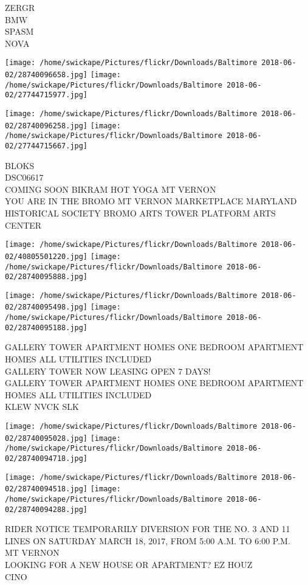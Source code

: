 \documentclass[10pt,letterpaper]{article}
\begin{document}
ZERGR\\
BMW\\
SPASM\\
NOVA
\pagebreak

\texttt{[image: /home/swickape/Pictures/flickr/Downloads/Baltimore 2018-06-02/28740096658.jpg]}
\texttt{[image: /home/swickape/Pictures/flickr/Downloads/Baltimore 2018-06-02/27744715977.jpg]}

\texttt{[image: /home/swickape/Pictures/flickr/Downloads/Baltimore 2018-06-02/28740096258.jpg]}
\texttt{[image: /home/swickape/Pictures/flickr/Downloads/Baltimore 2018-06-02/27744715667.jpg]}

BLOKS\\
DSC06617\\
COMING SOON BIKRAM HOT YOGA MT VERNON\\
YOU ARE IN THE BROMO MT VERNON MARKETPLACE MARYLAND HISTORICAL SOCIETY BROMO ARTS TOWER PLATFORM ARTS CENTER
\pagebreak

\texttt{[image: /home/swickape/Pictures/flickr/Downloads/Baltimore 2018-06-02/40805501220.jpg]}
\texttt{[image: /home/swickape/Pictures/flickr/Downloads/Baltimore 2018-06-02/28740095888.jpg]}

\texttt{[image: /home/swickape/Pictures/flickr/Downloads/Baltimore 2018-06-02/28740095498.jpg]}
\texttt{[image: /home/swickape/Pictures/flickr/Downloads/Baltimore 2018-06-02/28740095188.jpg]}

GALLERY TOWER APARTMENT HOMES ONE BEDROOM APARTMENT HOMES ALL UTILITIES INCLUDED\\
GALLERY TOWER NOW LEASING OPEN 7 DAYS!\\
GALLERY TOWER APARTMENT HOMES ONE BEDROOM APARTMENT HOMES ALL UTILITIES INCLUDED\\
KLEW NVCK SLK
\pagebreak

\texttt{[image: /home/swickape/Pictures/flickr/Downloads/Baltimore 2018-06-02/28740095028.jpg]}
\texttt{[image: /home/swickape/Pictures/flickr/Downloads/Baltimore 2018-06-02/28740094718.jpg]}

\texttt{[image: /home/swickape/Pictures/flickr/Downloads/Baltimore 2018-06-02/28740094518.jpg]}
\texttt{[image: /home/swickape/Pictures/flickr/Downloads/Baltimore 2018-06-02/28740094288.jpg]}

RIDER NOTICE TEMPORARILY DIVERSION FOR THE NO. 3 AND 11 LINES ON SATURDAY MARCH 18, 2017, FROM 5:00 A.M. TO 6:00 P.M.\\
MT VERNON\\
LOOKING FOR A NEW HOUSE OR APARTMENT?  EZ HOUZ\\
CINO
\pagebreak
\end{document}
